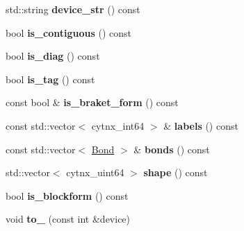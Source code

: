 \begin{DoxyCompactItemize}
\mbox{\label{classcytnx_1_1UniTensor_ae7862c67c8ce93035aa7c6ffb3fc0f17}} 
std\+::string {\bfseries device\+\_\+str} () const
\item 
\mbox{\label{classcytnx_1_1UniTensor_a0b2eb7bd2d16f74c43f991c2f3a64fac}} 
bool {\bfseries is\+\_\+contiguous} () const
\item 
\mbox{\label{classcytnx_1_1UniTensor_a8de198d36f24c6e9d49b357632ec0c98}} 
bool {\bfseries is\+\_\+diag} () const
\item 
\mbox{\label{classcytnx_1_1UniTensor_a1c3cbcbe162042897fe77c9ce7632af2}} 
bool {\bfseries is\+\_\+tag} () const
\item 
\mbox{\label{classcytnx_1_1UniTensor_ac7cce8eac4dc054af70723faa9d3bcf0}} 
const bool \& {\bfseries is\+\_\+braket\+\_\+form} () const
\item 
\mbox{\label{classcytnx_1_1UniTensor_a38073b2e56a0902146951155841c85bf}} 
const std\+::vector$<$ cytnx\+\_\+int64 $>$ \& {\bfseries labels} () const
\item 
\mbox{\label{classcytnx_1_1UniTensor_abc8348e0f56e2479dbe45273c3055b1b}} 
const std\+::vector$<$ \hyperlink{classcytnx_1_1Bond}{Bond} $>$ \& {\bfseries bonds} () const
\item 
\mbox{\label{classcytnx_1_1UniTensor_a38e60453fd51add542acdc43c8558f24}} 
std\+::vector$<$ cytnx\+\_\+uint64 $>$ {\bfseries shape} () const
\item 
\mbox{\label{classcytnx_1_1UniTensor_aac44ae40cb93f11f673ac0c1930ae319}} 
bool {\bfseries is\+\_\+blockform} () const
\item 
\mbox{\label{classcytnx_1_1UniTensor_a9aa08f2c848cc7d31bceac7656b4a976}} 
void {\bfseries to\+\_\+} (const int \&device)
\item 
\mbox{\label{classcytnx_1_1UniTensor_a025f4a2d775a9892b7f86aeff364fa49}} 

\end{DoxyCompactItemize}
